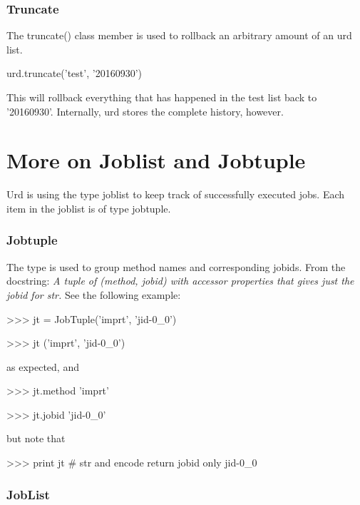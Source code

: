 \subsubsection{Truncate}

The truncate() class member is used to rollback an arbitrary amount of
an urd list.

\begin{python}
  urd.truncate('test', '20160930')
\end{python}
This will rollback everything that has happened in the test list back
to '20160930'.  Internally, urd stores the complete history, however.



\newpage
\section{More on Joblist and Jobtuple}

Urd is using the type joblist to keep track of successfully executed
jobs.  Each item in the joblist is of type jobtuple.

\subsubsection{Jobtuple}

The \jobtuple type is used to group method names and corresponding
jobids.  From the docstring: \textsl{ A tuple of (method, jobid) with
  accessor properties that gives just the jobid for str.}  See the
following example:

\begin{python}
>>> jt = JobTuple('imprt', 'jid-0_0')

>>> jt
('imprt', 'jid-0_0')
\end{python}

\noindent as expected, and

\begin{python}
>>> jt.method
'imprt'

>>> jt.jobid
'jid-0_0'
\end{python}

\noindent but note that

\begin{python}
>>> print jt  # str and encode return jobid only
jid-0_0
\end{python}



\subsubsection{JobList}

